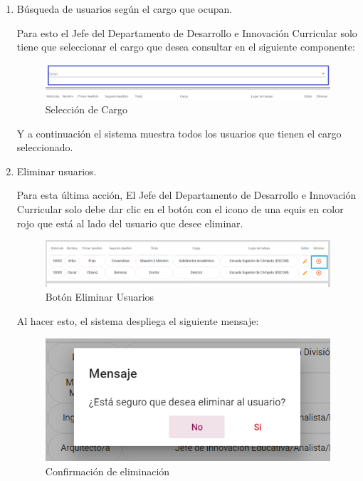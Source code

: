 \begin{enumerate}
	
	\item   Búsqueda de  usuarios según el cargo que ocupan.
	
	Para esto el Jefe del Departamento de Desarrollo e Innovación Curricular solo tiene que seleccionar el cargo que desea consultar en el siguiente componente:
	
	\begin{figure}[H]
		\centering
		\hypertarget{cargo1-JDDIC}{\includegraphics[width=0.7\linewidth]{images/SP5/BtnCargo1}}
		\caption{Selección de Cargo}
		\label{cargo1-JDDIC}
	\end{figure}
	
	Y a continuación el sistema muestra todos los usuarios que tienen el cargo seleccionado.
	
	\newpage
	
	\item Eliminar usuarios.
	
	Para esta última acción, El Jefe del Departamento de Desarrollo e Innovación Curricular solo debe dar clic en el botón con el icono de una equis en color rojo que está al lado del usuario que desee eliminar.
	
	\begin{figure}[H]
		\centering
		\hypertarget{eliminar-JDDIC}{\includegraphics[width=0.7\linewidth]{images/SP5/BtnEliminar}}
		\caption{Botón Eliminar Usuarios}
		\label{eliminar-JDDIC}
	\end{figure}
	
	Al hacer esto, el sistema despliega el siguiente mensaje:
	
	\begin{figure}[H]
		\centering
		\includegraphics[width=0.4\linewidth]{images/SP5/MSG22}
		\caption{Confirmación de eliminación}
		\label{confirmarE-JDDIC}
		

\end{figure}
\end{enumerate}
